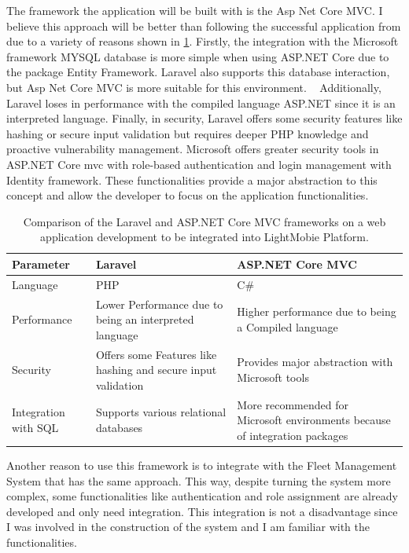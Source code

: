 The framework the application will be built with is the Asp Net Core MVC. 
I believe this approach will be better than following the successful application from \citet{MAS_MOTORS} due to a variety of reasons shown in \ref{table:architetcture_comparison}.
Firstly, the integration with the Microsoft framework MYSQL database is more simple when using ASP.NET Core due to the package Entity Framework. %
Laravel also supports this database interaction, but Asp Net Core MVC is more suitable for this environment. ~\cite{asp_net_vs_laravel}
Additionally, Laravel loses in performance with the compiled language ASP.NET since it is an interpreted language. 
Finally, in security, Laravel offers some security features like hashing or secure input validation but requires deeper PHP knowledge and proactive vulnerability management. 
Microsoft offers greater security tools in ASP.NET Core mvc with role-based authentication and login management with Identity framework.
These functionalities provide a major abstraction to this concept and allow the developer to focus on the application functionalities. ~\cite{asp_net_vs_laravel}


\begin{table}[]
    \begin{tabular}{| m{5em} | m{15em} | m{15em} |}
      \hline
   Parameter & Laravel  & ASP.NET Core MVC   \\
     \hline
   Language & PHP & C\#  \\
     \hline
   Performance & Lower Performance due to being an interpreted language & Higher performance due to being a Compiled language   \\
     \hline
   Security & Offers some Features like hashing and secure input validation & Provides major abstraction with Microsoft tools   \\
     \hline
   Integration with SQL & Supports various relational databases & More recommended for Microsoft environments because of integration packages  \\
     \hline
  \end{tabular}
    \caption{Comparison of the Laravel and ASP.NET Core MVC frameworks on a web application development to be integrated into LightMobie Platform.}
    \label{table:architetcture_comparison}
    \end{table}

  Another reason to use this framework is to integrate with the Fleet Management System that has the same approach. 
  This way, despite turning the system more complex, some functionalities like authentication and role assignment are already developed and only need integration. 
  This integration is not a disadvantage since I was involved in the construction of the system and I am familiar with the functionalities.
  
  



